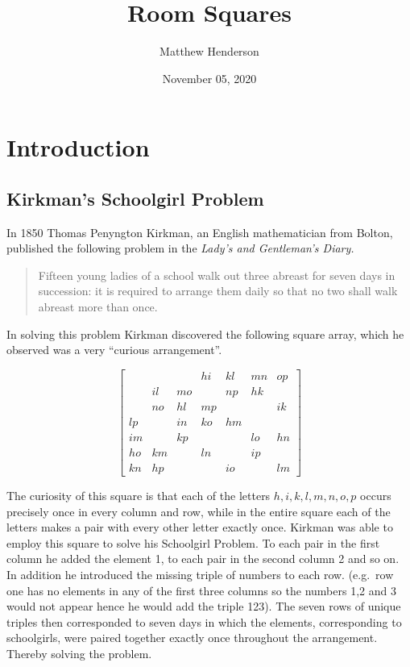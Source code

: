 \documentclass[
  11pt,
  a4paper]{book}
\title{Room Squares}
\author{Matthew Henderson}
\date{November 05, 2020}
\begin{document}
\maketitle

{
\setcounter{tocdepth}{1}
\tableofcontents
}
\hypertarget{introduction}{%
\chapter{Introduction}\label{introduction}}

\hypertarget{kirkmans-schoolgirl-problem}{%
\section{Kirkman's Schoolgirl Problem}\label{kirkmans-schoolgirl-problem}}

In 1850 Thomas Penyngton Kirkman, an English mathematician from Bolton,
published the following problem in the \emph{Lady's and Gentleman's Diary.}

\begin{quote}
Fifteen young ladies of a school walk out three abreast for seven
days in succession: it is required to arrange them daily so that no
two shall walk abreast more than once.
\end{quote}

In solving this problem Kirkman discovered the following square array,
which he observed was a very ``curious arrangement''.

\begin{equation}
  \label{eq:roomsquare}
  \begin{bmatrix}
       &    &    & hi & kl & mn & op \\
       & il & mo &    & np & hk &    \\
       & no & hl & mp &    &    & ik \\
    lp &    & in & ko & hm &    &    \\
    im &    & kp &    &    & lo & hn \\
    ho & km &    & ln &    & ip &    \\
    kn & hp &    &    & io &    & lm 
  \end{bmatrix}
\end{equation}

The curiosity of this square is that each of the letters
\(h, i, k, l, m, n, o, p\)
occurs precisely once in every column and row, while in the entire
square each of the letters makes a pair with every other letter exactly
once. Kirkman was able to employ this square to solve his Schoolgirl
Problem. To each pair in the first column he added the element 1, to
each pair in the second column 2 and so on. In addition he introduced
the missing triple of numbers to each row. (e.g.~row one has no elements
in any of the first three columns so the numbers 1,2 and 3 would not
appear hence he would add the triple 123). The seven rows of unique
triples then corresponded to seven days in which the elements,
corresponding to schoolgirls, were paired together exactly once
throughout the arrangement. Thereby solving the problem.
\end{document}
